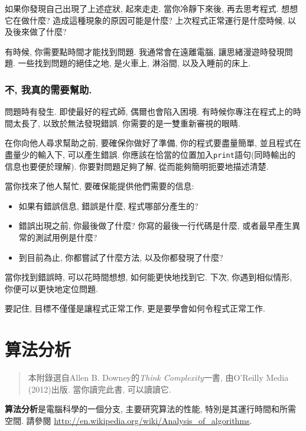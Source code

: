 \documentclass[10pt]{book}
\begin{document}
如果你發現自己出現了上述症狀, 起來走走. 
當你冷靜下來後, 再去思考程式. 
想想它在做什麼? 造成這種現象的原因可能是什麼?
上次程式正常運行是什麼時候, 以及後來做了什麼?

有時候, 你需要點時間才能找到問題. 
我通常會在遠離電腦, 讓思緒漫遊時發現問題. 
一些找到問題的絕佳之地, 是火車上, 淋浴間, 以及入睡前的床上. 


\subsection{不, 我真的需要幫助.}

問題時有發生. 即使最好的程式師, 偶爾也會陷入困境. 
有時候你專注在程式上的時間太長了, 以致於無法發現錯誤. 
你需要的是一雙重新審視的眼睛. 

在你向他人尋求幫助之前, 要確保你做好了準備, 
你的程式要盡量簡單, 並且程式在盡量少的輸入下, 可以產生錯誤. 
你應該在恰當的位置加入{\tt print}語句(同時輸出的信息也要便於理解). 
你要對問題足夠了解, 從而能夠簡明扼要地描述清楚. 

當你找來了他人幫忙, 要確保能提供他們需要的信息:

\begin{itemize}

\item 如果有錯誤信息, 錯誤是什麼, 程式哪部分產生的?

\item 錯誤出現之前, 你最後做了什麼?
你寫的最後一行代碼是什麼, 或者最早產生異常的測試用例是什麼?

\item 到目前為止, 你都嘗試了什麼方法, 以及你都發現了什麼?

\end{itemize}

當你找到錯誤時, 可以花時間想想, 如何能更快地找到它. 
下次, 你遇到相似情形, 你便可以更快地定位問題. 

要記住, 目標不僅僅是讓程式正常工作, 更是要學會如何令程式正常工作. 


\chapter{算法分析}
\label{algorithms}

\begin{quote}
本附錄選自Allen B. Downey的{\it Think Complexity}一書, 由O'Reilly Media (2012)出版. 
當你讀完此書, 可以讀讀它. 
\end{quote}

{\bf 算法分析}是電腦科學的一個分支, 主要研究算法的性能, 特別是其運行時間和所需空間. 
請參閱
\url{http://en.wikipedia.org/wiki/Analysis_of_algorithms}.
 
\end{document}
